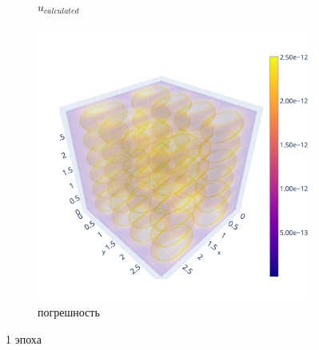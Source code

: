 \documentclass[a4paper,hidelinks,12pt]{article}
\begin{document}
\begin{figure}[H]
\begin{subfigure}{.33\textwidth}
  \caption{$u_{calculated}$}
\end{subfigure}%
\begin{subfigure}{.33\textwidth}
  \centering
  \includegraphics[width=\linewidth]{pictures/1_L1_256_diff.png}
  \caption{погрешность}
\end{subfigure}%
\caption{1 эпоха}
\label{fig:fig}
\end{figure}
\end{document}
